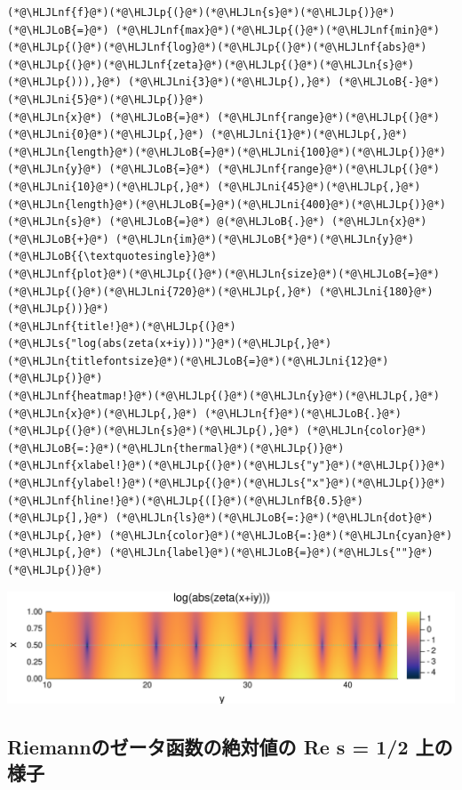 \documentclass[12pt,a4paper,xelatex,ja=standard]{bxjsarticle}
\newcommand{\HLJLn}[1]{#1}
\newcommand{\HLJLnf}[1]{\textcolor[RGB]{66,102,213}{#1}}
\newcommand{\HLJLs}[1]{\textcolor[RGB]{201,61,57}{#1}}
\newcommand{\HLJLnfB}[1]{\textcolor[RGB]{59,151,46}{#1}}
\newcommand{\HLJLni}[1]{\textcolor[RGB]{59,151,46}{#1}}
\newcommand{\HLJLoB}[1]{\textcolor[RGB]{102,102,102}{\textbf{#1}}}
\newcommand{\HLJLp}[1]{#1}
\begin{document}
\begin{lstlisting}
(*@\HLJLnf{f}@*)(*@\HLJLp{(}@*)(*@\HLJLn{s}@*)(*@\HLJLp{)}@*) (*@\HLJLoB{=}@*) (*@\HLJLnf{max}@*)(*@\HLJLp{(}@*)(*@\HLJLnf{min}@*)(*@\HLJLp{(}@*)(*@\HLJLnf{log}@*)(*@\HLJLp{(}@*)(*@\HLJLnf{abs}@*)(*@\HLJLp{(}@*)(*@\HLJLnf{zeta}@*)(*@\HLJLp{(}@*)(*@\HLJLn{s}@*)(*@\HLJLp{))),}@*) (*@\HLJLni{3}@*)(*@\HLJLp{),}@*) (*@\HLJLoB{-}@*)(*@\HLJLni{5}@*)(*@\HLJLp{)}@*)
(*@\HLJLn{x}@*) (*@\HLJLoB{=}@*) (*@\HLJLnf{range}@*)(*@\HLJLp{(}@*)(*@\HLJLni{0}@*)(*@\HLJLp{,}@*) (*@\HLJLni{1}@*)(*@\HLJLp{,}@*) (*@\HLJLn{length}@*)(*@\HLJLoB{=}@*)(*@\HLJLni{100}@*)(*@\HLJLp{)}@*)
(*@\HLJLn{y}@*) (*@\HLJLoB{=}@*) (*@\HLJLnf{range}@*)(*@\HLJLp{(}@*)(*@\HLJLni{10}@*)(*@\HLJLp{,}@*) (*@\HLJLni{45}@*)(*@\HLJLp{,}@*) (*@\HLJLn{length}@*)(*@\HLJLoB{=}@*)(*@\HLJLni{400}@*)(*@\HLJLp{)}@*)
(*@\HLJLn{s}@*) (*@\HLJLoB{=}@*) @(*@\HLJLoB{.}@*) (*@\HLJLn{x}@*) (*@\HLJLoB{+}@*) (*@\HLJLn{im}@*)(*@\HLJLoB{*}@*)(*@\HLJLn{y}@*)(*@\HLJLoB{{\textquotesingle}}@*)
(*@\HLJLnf{plot}@*)(*@\HLJLp{(}@*)(*@\HLJLn{size}@*)(*@\HLJLoB{=}@*)(*@\HLJLp{(}@*)(*@\HLJLni{720}@*)(*@\HLJLp{,}@*) (*@\HLJLni{180}@*)(*@\HLJLp{))}@*)
(*@\HLJLnf{title!}@*)(*@\HLJLp{(}@*)(*@\HLJLs{"log(abs(zeta(x+iy)))"}@*)(*@\HLJLp{,}@*) (*@\HLJLn{titlefontsize}@*)(*@\HLJLoB{=}@*)(*@\HLJLni{12}@*)(*@\HLJLp{)}@*)
(*@\HLJLnf{heatmap!}@*)(*@\HLJLp{(}@*)(*@\HLJLn{y}@*)(*@\HLJLp{,}@*) (*@\HLJLn{x}@*)(*@\HLJLp{,}@*) (*@\HLJLn{f}@*)(*@\HLJLoB{.}@*)(*@\HLJLp{(}@*)(*@\HLJLn{s}@*)(*@\HLJLp{),}@*) (*@\HLJLn{color}@*)(*@\HLJLoB{=:}@*)(*@\HLJLn{thermal}@*)(*@\HLJLp{)}@*)
(*@\HLJLnf{xlabel!}@*)(*@\HLJLp{(}@*)(*@\HLJLs{"y"}@*)(*@\HLJLp{)}@*)
(*@\HLJLnf{ylabel!}@*)(*@\HLJLp{(}@*)(*@\HLJLs{"x"}@*)(*@\HLJLp{)}@*)
(*@\HLJLnf{hline!}@*)(*@\HLJLp{([}@*)(*@\HLJLnfB{0.5}@*)(*@\HLJLp{],}@*) (*@\HLJLn{ls}@*)(*@\HLJLoB{=:}@*)(*@\HLJLn{dot}@*)(*@\HLJLp{,}@*) (*@\HLJLn{color}@*)(*@\HLJLoB{=:}@*)(*@\HLJLn{cyan}@*)(*@\HLJLp{,}@*) (*@\HLJLn{label}@*)(*@\HLJLoB{=}@*)(*@\HLJLs{""}@*)(*@\HLJLp{)}@*)
\end{lstlisting}


\begin{center}
\includegraphics[width=0.8\linewidth]{figures/テスト_5_1.pdf}
\end{center}

\subsection{Riemannのゼータ函数の絶対値の Re s = 1/2 上の様子}
\end{document}
